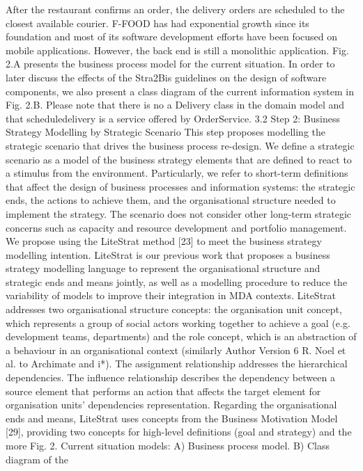 After the restaurant confirms an order, the delivery orders are scheduled to the
closest available courier. F-FOOD has had exponential growth since its foundation and most of its software development efforts have been focused on mobile
applications. However, the back end is still a monolithic application.
Fig. 2.A presents the business process model for the current situation. In
order to later discuss the effects of the Stra2Bis guidelines on the design of
software components, we also present a class diagram of the current information
system in Fig. 2.B. Please note that there is no a Delivery class in the domain
model and that scheduledelivery is a service offered by OrderService.
3.2 Step 2: Business Strategy Modelling by Strategic Scenario
This step proposes modelling the strategic scenario that drives the business
process re-design. We define a strategic scenario as a model of the business
strategy elements that are defined to react to a stimulus from the environment.
Particularly, we refer to short-term definitions that affect the design of business
processes and information systems: the strategic ends, the actions to achieve
them, and the organisational structure needed to implement the strategy. The
scenario does not consider other long-term strategic concerns such as capacity
and resource development and portfolio management.
We propose using the LiteStrat method [23] to meet the business strategy
modelling intention. LiteStrat is our previous work that proposes a business
strategy modelling language to represent the organisational structure and strategic ends and means jointly, as well as a modelling procedure to reduce the variability of models to improve their integration in MDA contexts.
LiteStrat addresses two organisational structure concepts: the organisation
unit concept, which represents a group of social actors working together to
achieve a goal (e.g. development teams, departments) and the role concept,
which is an abstraction of a behaviour in an organisational context (similarly
Author Version
6 R. Noel et al.
to Archimate and i*). The assignment relationship addresses the hierarchical
dependencies. The influence relationship describes the dependency between a
source element that performs an action that affects the target element for organisation units’ dependencies representation. Regarding the organisational ends
and means, LiteStrat uses concepts from the Business Motivation Model [29],
providing two concepts for high-level definitions (goal and strategy) and the more
Fig. 2. Current situation models: A) Business process model. B) Class diagram of the
